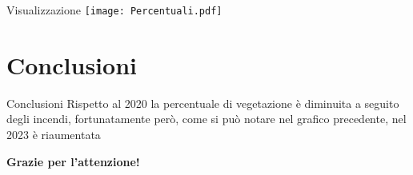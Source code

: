 \documentclass{beamer}
\begin{document}
\begin{frame}{Visualizzazione}
    \texttt{[image: Percentuali.pdf]}
\end{frame}

\section{Conclusioni}

\begin{frame}{Conclusioni}
Rispetto al 2020 la percentuale di vegetazione è diminuita a seguito degli incendi, fortunatamente però, come si può notare nel grafico precedente, nel 2023 è riaumentata
\end{frame}

\begin{frame}{}
    \centering \textbf{Grazie per l'attenzione!}
\end{frame}
\end{document}
